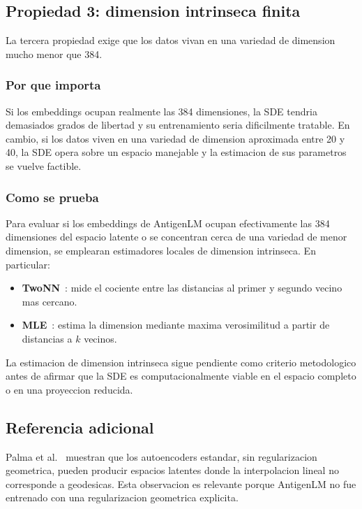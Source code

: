 \documentclass[12pt,letterpaper]{article}
\begin{document}
\subsection{Propiedad 3: dimension intrinseca finita}

La tercera propiedad exige que los datos vivan en una variedad de dimension mucho menor que 384.

\subsubsection*{Por que importa}

Si los embeddings ocupan realmente las 384 dimensiones, la SDE tendria demasiados grados de libertad y su entrenamiento seria dificilmente tratable. En cambio, si los datos viven en una variedad de dimension aproximada entre 20 y 40, la SDE opera sobre un espacio manejable y la estimacion de sus parametros se vuelve factible.

\subsubsection*{Como se prueba}

Para evaluar si los embeddings de AntigenLM ocupan efectivamente las 384 dimensiones del espacio latente o se concentran cerca de una variedad de menor dimension, se emplearan estimadores locales de dimension intrinseca. En particular:

\begin{itemize}[leftmargin=2em]
    \item \textbf{TwoNN}~\cite{facco2017intrinsic}: mide el cociente entre las distancias al primer y segundo vecino mas cercano.
    \item \textbf{MLE}~\cite{levina2004mle}: estima la dimension mediante maxima verosimilitud a partir de distancias a $k$ vecinos.
\end{itemize}

La estimacion de dimension intrinseca sigue pendiente como criterio metodologico antes de afirmar que la SDE es computacionalmente viable en el espacio completo o en una proyeccion reducida.

\subsection{Referencia adicional}

Palma et al.~\cite{palma2025flatvi} muestran que los autoencoders estandar, sin regularizacion geometrica, pueden producir espacios latentes donde la interpolacion lineal no corresponde a geodesicas. Esta observacion es relevante porque AntigenLM no fue entrenado con una regularizacion geometrica explicita.
\end{document}

